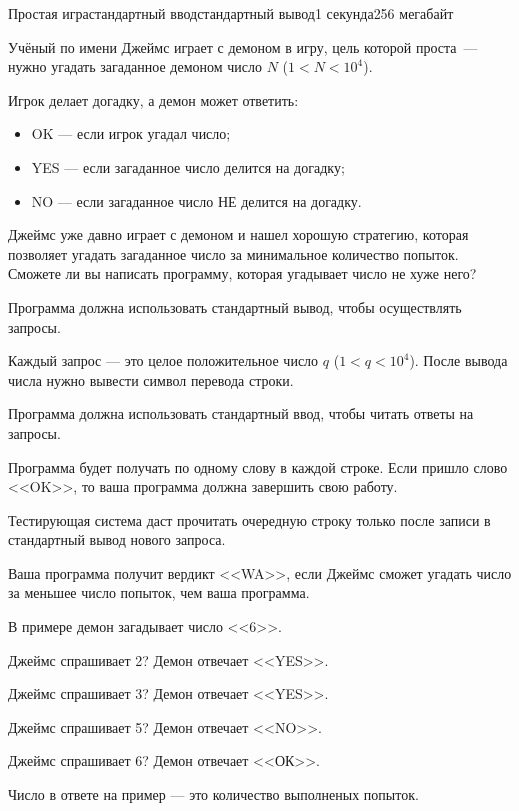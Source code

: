 \begin{problem}[(Леверьев В.\,С.)]{Простая игра}{стандартный ввод}{стандартный вывод}{1 секунда}{256 мегабайт}

Учёный по имени Джеймс играет с демоном в игру, цель которой проста~--- нужно угадать загаданное демоном число $N$ ($1 < N < 10^4$).

Игрок делает догадку, а демон может ответить:

\begin{itemize}\setlength\itemsep{0pt}
\item OK --- если игрок угадал число;
\item YES --- если загаданное число делится на догадку;
\item NO --- если загаданное число НЕ делится на догадку.
\end{itemize}

Джеймс уже давно играет с демоном и нашел хорошую стратегию, которая позволяет угадать загаданное число за минимальное количество попыток.
Сможете ли вы написать программу, которая угадывает число не хуже него?

\Interaction
Программа должна использовать стандартный вывод, чтобы осуществлять запросы.

Каждый запрос --- это целое положительное число $q$ ($1 < q < 10^4$). После вывода числа нужно вывести символ перевода строки.

Программа должна использовать стандартный ввод, чтобы читать ответы на запросы.

Программа будет получать по одному слову в каждой строке. Если пришло слово <<OK>>, то ваша программа должна завершить свою работу.

Тестирующая система даст прочитать очередную строку только после записи в стандартный вывод нового запроса.

\Example

\begin{example}
%
\end{example}

\Note
Ваша программа получит вердикт <<WA>>, если Джеймс сможет угадать число за меньшее число попыток, чем ваша программа.

В примере демон загадывает число <<6>>.

Джеймс спрашивает 2? Демон отвечает <<YES>>.

Джеймс спрашивает 3? Демон отвечает <<YES>>.

Джеймс спрашивает 5? Демон отвечает <<NO>>.

Джеймс спрашивает 6? Демон отвечает <<ОК>>.

Число в ответе на пример --- это количество выполненых попыток.

\end{problem}

